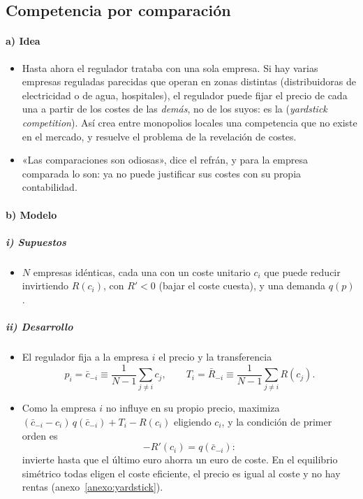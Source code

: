 \documentclass[11pt]{article}
\begin{document}
\subsection{Competencia por comparación}\label{sec:yardstick}

\paragraph{a) Idea}

\begin{itemize}
\item Hasta ahora el regulador trataba con una sola empresa. Si hay varias empresas reguladas parecidas que operan en zonas distintas (distribuidoras de electricidad o de agua, hospitales), el regulador puede fijar el precio de cada una a partir de los costes de las \emph{demás}, no de los suyos: es la  (\emph{yardstick competition})\nocite{Shleifer1985Theory,BaldwinCaveLodge2012Understanding}. Así crea entre monopolios locales una competencia que no existe en el mercado, y resuelve el problema de la revelación de costes.
\item «Las comparaciones son odiosas», dice el refrán, y para la empresa comparada lo son: ya no puede justificar sus costes con su propia contabilidad.
\end{itemize}

\paragraph{b) Modelo}

\subparagraph{i) Supuestos}

\begin{itemize}
\item $N$ empresas idénticas, cada una con un coste unitario $c_i$ que puede reducir invirtiendo $R(c_i)$, con $R'<0$ (bajar el coste cuesta), y una demanda $q(p)$.
\end{itemize}

\subparagraph{ii) Desarrollo}

\begin{itemize}
\item El regulador fija a la empresa $i$ el precio y la transferencia
  \begin{equation}
  p_i=\bar{c}_{-i}\equiv\frac{1}{N-1}\sum_{j\neq i}c_j,\qquad T_i=\bar{R}_{-i}\equiv\frac{1}{N-1}\sum_{j\neq i}R(c_j). \label{eq:yardstick}
  \end{equation}
\item Como la empresa $i$ no influye en su propio precio, maximiza $(\bar{c}_{-i}-c_i)\,q(\bar{c}_{-i})+T_i-R(c_i)$ eligiendo $c_i$, y la condición de primer orden es
  \[
  -R'(c_i)=q(\bar{c}_{-i}):
  \]
  invierte hasta que el último euro ahorra un euro de coste. En el equilibrio simétrico todas eligen el coste eficiente, el precio es igual al coste y no hay rentas (anexo~\ref{anexo:yardstick}).
\end{itemize}
\end{document}
